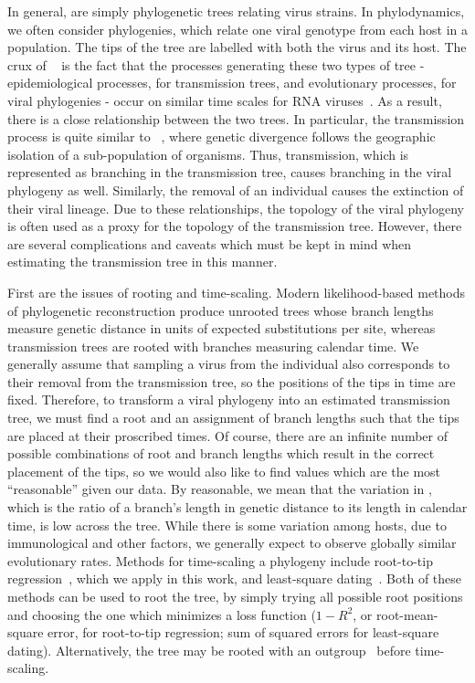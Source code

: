 In general,  are simply phylogenetic trees relating
virus strains. In phylodynamics, we often consider 
phylogenies, which relate one viral genotype from each host in a population.
The tips of the tree are labelled with both the virus and its host. The crux of
~\autocite{grenfell2004unifying} is the fact that the
processes generating these two types of tree - epidemiological processes, for
transmission trees, and evolutionary processes, for viral phylogenies - occur
on similar time scales for RNA viruses~\autocite{drummond2003measurably}. As a
result, there is a close relationship between the two trees. In particular, the
transmission process is quite similar to ~\autocite{coyne2004speciation}, where genetic divergence follows
the geographic isolation of a sub-population of organisms. Thus, transmission,
which is represented as branching in the transmission tree, causes branching in
the viral phylogeny as well. Similarly, the removal of an individual causes the
extinction of their viral lineage. Due to these relationships, the topology of
the viral phylogeny is often used as a proxy for the topology of the
transmission tree. However, there are several complications and caveats which
must be kept in mind when estimating the transmission tree in this manner.

First are the issues of rooting and time-scaling. Modern likelihood-based
methods of phylogenetic reconstruction produce unrooted trees whose branch
lengths measure genetic distance in units of expected substitutions per site,
whereas transmission trees are rooted with branches measuring calendar time. We
generally assume that sampling a virus from the individual also corresponds to
their removal from the transmission tree, so the positions of the tips in time
are fixed. Therefore, to transform a viral phylogeny into an estimated
transmission tree, we must find a root and an assignment of branch lengths such
that the tips are placed at their proscribed times. Of course, there are an
infinite number of possible combinations of root and branch lengths which
result in the correct placement of the tips, so we would also like to find
values which are the most ``reasonable'' given our data. By reasonable, we mean
that the variation in , which is the ratio of a
branch's length in genetic distance to its length in calendar time, is low
across the tree. While there is some variation among hosts, due to
immunological and other factors, we generally expect to observe globally
similar evolutionary rates. Methods for time-scaling a phylogeny include
root-to-tip regression~\autocite{shankarappa1999consistent, korber2000timing,
drummond2003inference}, which we apply in this work, and least-square
dating~\autocite{to2015fast}. Both of these methods can be used to root the
tree, by simply trying all possible root positions and choosing the one which
minimizes a loss function ($1-R^2$, or root-mean-square error, for root-to-tip
regression; sum of squared errors for least-square dating). Alternatively, the
tree may be rooted with an outgroup~\autocite{li1988rates} before time-scaling.


